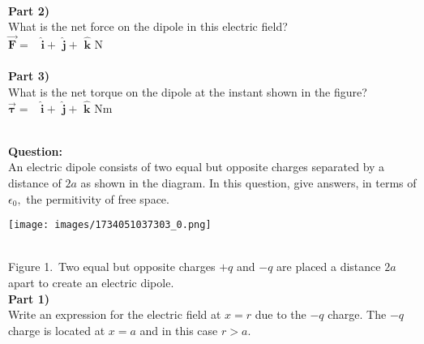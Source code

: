 \documentclass[addpoints,12pt, margin-left=35px]{exam}
\begin{document}
\\

\textbf{Part 2)}\\

What is the net force on the dipole in this electric field?\\

$\mathbf{\vec{F}} = $  \underline{\hspace{3cm}}  $ \mathbf{\hat{i}} + $  \underline{\hspace{3cm}}  $\mathbf{\hat{j}} + $ \underline{\hspace{3cm}}  $\mathbf{\hat{k}} \text{ N}$ \\

\\

\textbf{Part 3)}\\

What is the net torque on the dipole at the instant shown in the figure?\\

$\mathbf{\vec{\tau}} = $  \underline{\hspace{3cm}}  $ \mathbf{\hat{i}} + $  \underline{\hspace{3cm}}  $\mathbf{\hat{j}} + $ \underline{\hspace{3cm}}  $\mathbf{\hat{k}} \text{ Nm}$ \\

\\

\newpage

\textbf{Question:}\\

An electric dipole consists of two equal but opposite charges separated by a distance of $2a$ as shown in the diagram. In this question, give answers, in terms of $\epsilon_0,$ the permitivity of free space.\\

\begin{center}
\texttt{[image: images/1734051037303\_0.png]}
\end{center}\\

Figure 1. Two equal but opposite charges $+q$ and $-q$ are placed a distance $2a$ apart to create an electric dipole.\\

\textbf{Part 1)}\\

Write an expression for the electric field at $x = r$ due to the $-q$ charge. The $-q$ charge is located at $x=a$ and in this case $r>a.$\\
\end{document}
